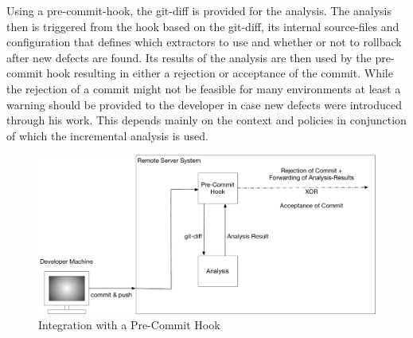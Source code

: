 \documentclass[a4paper]{article}
\begin{document}
Using a pre-commit-hook, the git-diff is provided for the analysis. The analysis then is triggered from the hook based on the git-diff, its internal source-files and configuration that defines which extractors to use and whether or not to rollback after new defects are found. Its results of the analysis are then used by the pre-commit hook resulting in either a rejection or acceptance of the commit. While the rejection of a commit might not be feasible for many environments at least a warning should be provided to the developer in case new defects were introduced through his work. This depends mainly on the context and policies in conjunction of which the incremental analysis is used. 

\begin{figure}[htbp] 
  \centering
  \begin{minipage}[b]{1\textwidth} 
    \caption[Integration with a Pre-Commit Hook]{Integration with a Pre-Commit Hook}\label{fig:pre-commit}
    \includegraphics[width=1\textwidth]{img/IntegrationPreCommitHook.pdf}
  \end{minipage}
\end{figure}





\newpage


\end{document}

